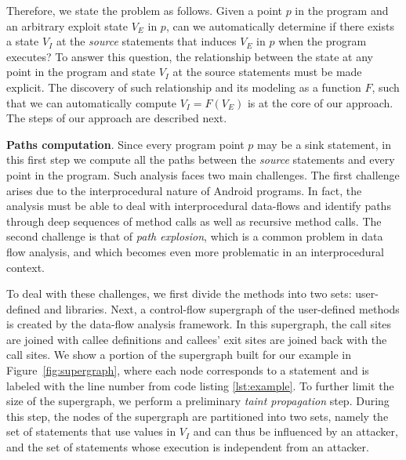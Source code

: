  Therefore, we state the problem as follows. Given a point $p$ in the program and an arbitrary exploit state $V_E$ in $p$, can we automatically determine if there exists a state $V_I$ at the \textit{source} statements that induces $V_E$ in $p$ when the program executes?  To answer this question, the relationship between the state at any point in the program and state $V_I$ at the source statements must be made explicit. The discovery of such relationship and its modeling as a function $F$, such that we can automatically compute $V_I = F(V_E)$ is at the core of our approach. The steps of our approach are described next. 

\textbf{Paths computation}. Since every program point $p$ may be a sink statement, in this first step we compute all the paths between the \textit{source} statements and every point in the program. Such analysis faces two main challenges. The first challenge arises due to the interprocedural nature of Android programs. In fact, the analysis must be able to deal with interprocedural data-flows and identify paths through deep sequences of method calls as well as recursive method calls. The second challenge is that of \textit{path explosion}, which is a common problem in data flow analysis, and which becomes even more problematic in an interprocedural context. 

To deal with these challenges, we first divide the methods into two sets: user-defined and libraries. Next, a control-flow supergraph of the user-defined methods is created by the data-flow analysis framework. In this supergraph, the call sites are joined with callee definitions and callees' exit sites are joined back with the call sites. We show a portion of the supergraph built for our example in Figure~\ref{fig:supergraph}, where each node corresponds to a statement and is labeled with the line number from code listing \ref{lst:example}. To further limit the size of the supergraph, we perform a preliminary \textit{taint propagation} step. During this step, the nodes of the supergraph are partitioned into two sets, namely the set of statements that use values in $V_I$ and can thus be influenced by an attacker, and the set of statements whose execution is independent from an attacker. 

